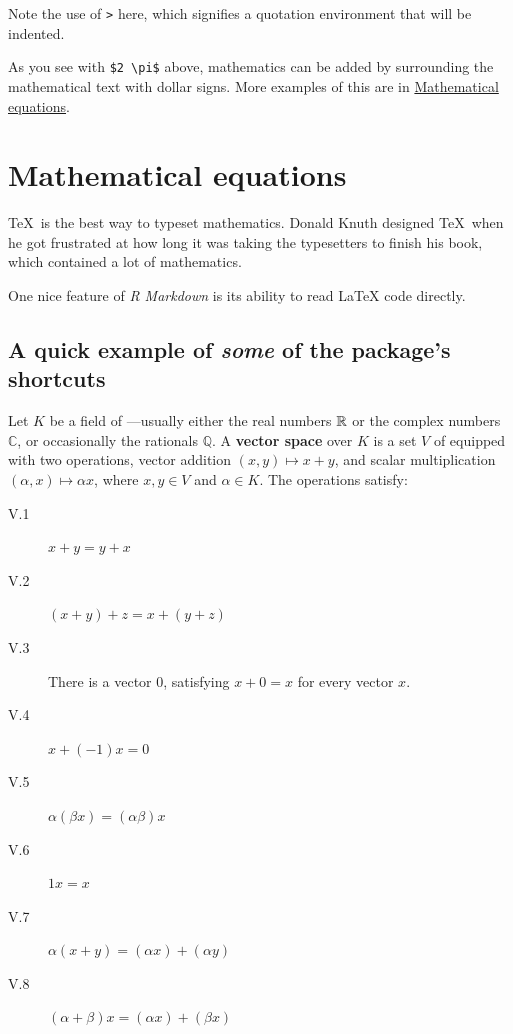\documentclass{article}
\newcommand{\idfn}[1]{{\boldmath\textbf{#1}}\index{#1}} %
\begin{document}
Note the use of \texttt{\textgreater{}} here, which signifies a
quotation environment that will be indented.

As you see with \texttt{\$2\ \textbackslash{}pi\$} above, mathematics
can be added by surrounding the mathematical text with dollar signs.
More examples of this are in
\protect\hyperlink{mathematical-equations}{Mathematical equations}.

\hypertarget{mathematical-equations}{%
\section{Mathematical equations}\label{mathematical-equations}}

\TeX~is the best way to typeset mathematics. Donald Knuth designed
\TeX~when he got frustrated at how long it was taking the typesetters to
finish his book, which contained a lot of mathematics.

One nice feature of \emph{R Markdown} is its ability to read LaTeX code
directly.

\hypertarget{a-quick-example-of-some-of-the-packages-shortcuts}{%
\subsection{\texorpdfstring{A quick example of \emph{some} of the
package's
shortcuts}{A quick example of some of the package's shortcuts}}\label{a-quick-example-of-some-of-the-packages-shortcuts}}

Let \(K\) be a field of
---usually either the
real numbers \(\mathbb R\) or the complex numbers \(\mathbb C\), or
occasionally the rationals \(\mathbb Q\). A \idfn{vector space} over
\(K\) is a set \(V\) of  equipped with two
operations, vector addition \((x,y)\mapsto x+y\), and scalar
multiplication \((\alpha,x)\mapsto \alpha x\), where \(x,y\in V\) and
\(\alpha\in K\). The operations satisfy:

\begin{description}
\item[V.1] $x+y=y+x$
\item[V.2] $(x+y)+z=x+(y+z)$
\item[V.3] There is a vector $0$, satisfying $x+0=x$ for every vector $x$.
\item[V.4] $x+(-1)x=0$
\item[V.5] $\alpha(\beta x)=(\alpha \beta)x$
\item[V.6] $1x=x$
\item[V.7] $\alpha(x+y)=(\alpha x)+(\alpha y)$
\item[V.8] $(\alpha+\beta)x=(\alpha x)+(\beta x)$
\end{description}
\end{document}
